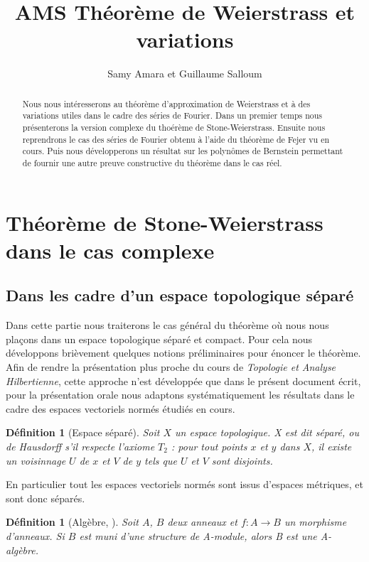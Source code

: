 \documentclass{amsart}
\title{AMS Théorème de Weierstrass et variations}
\author{Samy Amara et Guillaume Salloum}
\newtheorem{definition}[subsubsection]{Définition}
\begin{document}
\begin{abstract}
	Nous nous intéresserons au théorème d'approximation de Weierstrass et
	à des variations utiles dans le cadre des séries de Fourier. 
	Dans un premier temps nous présenterons la version complexe 
	du thoérème de Stone-Weierstrass.
	Ensuite nous reprendrons le cas
	des séries de Fourier obtenu à l'aide du théorème de Fejer vu en cours. 
	Puis nous développerons un résultat sur les polynômes de Bernstein permettant
	de fournir une autre preuve constructive du théorème dans le cas réel.
\end{abstract}

\maketitle
\setcounter{tocdepth}{2}
\tableofcontents

\section{Théorème de Stone-Weierstrass dans le cas complexe}
\subsection{Dans les cadre d'un espace topologique séparé}

\par Dans cette partie nous traiterons le cas général du théorème où nous nous plaçons dans 
un espace topologique séparé et compact. Pour cela nous développons brièvement quelques notions préliminaires pour énoncer le théorème.
Afin de rendre la présentation plus proche du cours de \textit{Topologie et Analyse Hilbertienne}, cette approche n'est développée que dans le présent document écrit, pour la présentation orale nous adaptons systématiquement les résultats dans le cadre des espaces vectoriels normés étudiés en cours.

\begin{definition}[Espace séparé]
	Soit \( X \) un espace topologique. X est dit \textit{séparé}, ou \textit{de Hausdorff} s'il respecte l'axiome \( T_{2} \) : pour tout points \( x \) et \( y \) dans \( X \), il existe un voisinnage \( U \) de \( x \) et \( V \) de \( y \) tels que \( U \) et \( V \) sont disjoints.
\end{definition}

En particulier tout les espaces vectoriels normés sont issus d'espaces métriques, et sont donc séparés.

\begin{definition}[Algèbre, \cite{atiyah1969introduction}]
	Soit \( A \), \( B \) deux anneaux et \( f : A \rightarrow B \) 
	un morphisme d'anneaux. Si \( B \) est muni d'une structure de \textit{A-module}, alors B est une \textit{A-algèbre}.
\end{definition}
\end{document}
